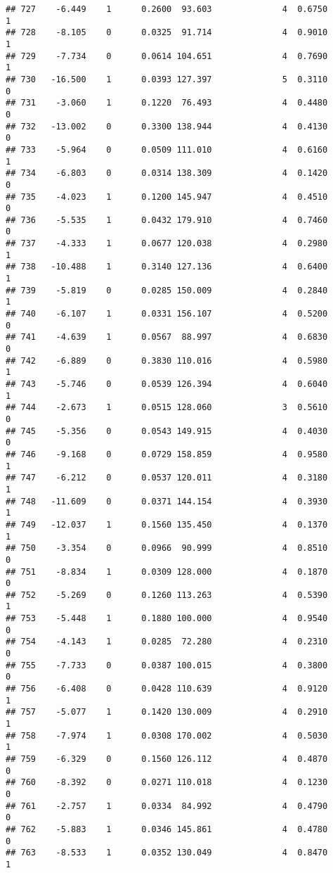 \documentclass[
]{article}
\begin{document}
\begin{verbatim}
## 727    -6.449    1      0.2600  93.603              4  0.6750      1
## 728    -8.105    0      0.0325  91.714              4  0.9010      1
## 729    -7.734    0      0.0614 104.651              4  0.7690      1
## 730   -16.500    1      0.0393 127.397              5  0.3110      0
## 731    -3.060    1      0.1220  76.493              4  0.4480      0
## 732   -13.002    0      0.3300 138.944              4  0.4130      0
## 733    -5.964    0      0.0509 111.010              4  0.6160      1
## 734    -6.803    0      0.0314 138.309              4  0.1420      0
## 735    -4.023    1      0.1200 145.947              4  0.4510      0
## 736    -5.535    1      0.0432 179.910              4  0.7460      0
## 737    -4.333    1      0.0677 120.038              4  0.2980      1
## 738   -10.488    1      0.3140 127.136              4  0.6400      1
## 739    -5.819    0      0.0285 150.009              4  0.2840      1
## 740    -6.107    1      0.0331 156.107              4  0.5200      0
## 741    -4.639    1      0.0567  88.997              4  0.6830      0
## 742    -6.889    0      0.3830 110.016              4  0.5980      1
## 743    -5.746    0      0.0539 126.394              4  0.6040      1
## 744    -2.673    1      0.0515 128.060              3  0.5610      0
## 745    -5.356    0      0.0543 149.915              4  0.4030      0
## 746    -9.168    0      0.0729 158.859              4  0.9580      1
## 747    -6.212    0      0.0537 120.011              4  0.3180      1
## 748   -11.609    0      0.0371 144.154              4  0.3930      1
## 749   -12.037    1      0.1560 135.450              4  0.1370      1
## 750    -3.354    0      0.0966  90.999              4  0.8510      0
## 751    -8.834    1      0.0309 128.000              4  0.1870      0
## 752    -5.269    0      0.1260 113.263              4  0.5390      1
## 753    -5.448    1      0.1880 100.000              4  0.9540      0
## 754    -4.143    1      0.0285  72.280              4  0.2310      0
## 755    -7.733    0      0.0387 100.015              4  0.3800      0
## 756    -6.408    0      0.0428 110.639              4  0.9120      1
## 757    -5.077    1      0.1420 130.009              4  0.2910      1
## 758    -7.974    1      0.0308 170.002              4  0.5030      1
## 759    -6.329    0      0.1560 126.112              4  0.4870      0
## 760    -8.392    0      0.0271 110.018              4  0.1230      0
## 761    -2.757    1      0.0334  84.992              4  0.4790      0
## 762    -5.883    1      0.0346 145.861              4  0.4780      0
## 763    -8.533    1      0.0352 130.049              4  0.8470      1

\end{verbatim}
\end{document}
